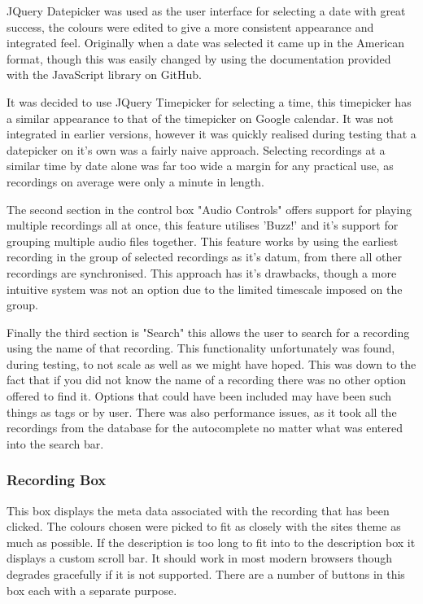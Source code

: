 \documentclass{l3proj}
\begin{document}
\gls{JQuery} Datepicker was used as the user interface for selecting a date with great success, the colours were edited to give a more consistent appearance and integrated feel. Originally when a date was selected it came up in the American format, though this was easily changed by using the documentation provided with the JavaScript library on GitHub.

It was decided to use JQuery Timepicker for selecting a time, this timepicker has a similar appearance to that of the timepicker on Google calendar. It was not integrated in earlier versions, however it was quickly realised during testing that a datepicker on it's own was a fairly naive approach. Selecting recordings at a similar time by date alone was far too wide a margin for any practical use, as recordings on average were only a minute in length.

The second section in the control box "Audio Controls" offers support for playing multiple recordings all at once, this feature utilises 'Buzz!' and it's support for grouping multiple audio files together. This feature works by using the earliest recording in the group of selected recordings as it's datum, from there all other recordings are synchronised. This approach has it's drawbacks, though a more intuitive system was not an option due to the limited timescale imposed on the group.

Finally the third section is "Search" this allows the user to search for a recording using the name of that recording. This functionality unfortunately was found, during testing, to not scale as well as we might have hoped. This was down to the fact that if you did not know the name of a recording there was no other option offered to find it. Options that could have been included may have been such things as tags or by user. There was also performance issues, as it took all the recordings from the database for the autocomplete no matter what was entered into the search bar.

\subsubsection{Recording Box}

This box displays the meta data associated with the recording that has been clicked. The colours chosen were picked to fit as closely with the sites theme as much as possible. If the description is too long to fit into to the description box it displays a custom  scroll bar. It should work in most modern browsers though degrades gracefully if it is not supported. There are a number of buttons in this box each with a separate purpose.
\end{document}

